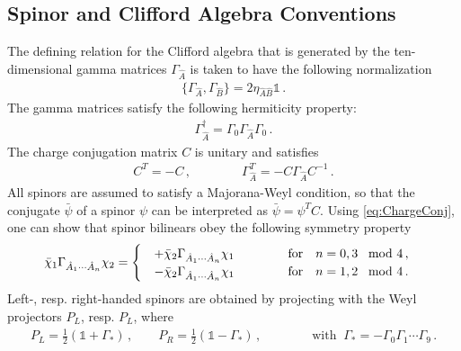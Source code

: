 \documentclass[a4paper,10pt,openany]{article}
\begin{document}
	
	\subsection{Spinor and Clifford Algebra Conventions} \label{ssec:fermconventions}
	
	The defining relation for the Clifford algebra that is generated by the ten-dimensional gamma matrices $\Gamma_{\hat{A}}$ is taken to have the following normalization
	\begin{align}
		\label{eq:Cliffalgdef}
		\{\Gamma_{\hat{A}}, \Gamma_{\hat{B}}\} = 2 \eta_{\hat{A}\hat{B}} \mathds{1} \,.
	\end{align}
	The gamma matrices satisfy the following hermiticity property:
	\begin{align}
		\label{eq:hermgammas}
		\Gamma_{\hat{A}}^\dag = \Gamma_0 \Gamma_{\hat{A}} \Gamma_0 \,.
	\end{align}
	The charge conjugation matrix $C$ is unitary and satisfies
	\begin{align}\label{eq:ChargeConj}
		C^T = -C\,,\qquad \qquad \Gamma_{\hat{A}}^T = - C\Gamma_{\hat A} C^{-1} \,.
	\end{align}
	All spinors are assumed to satisfy a Majorana-Weyl condition, so that the conjugate $\bar{\psi}$ of a spinor $\psi$ can be interpreted as $\bar{\psi} = \psi^T C$. Using \eqref{eq:ChargeConj}, one can show that spinor bilinears obey the following symmetry property
	\begin{align}\label{eq:flippingrulez}
		\bar\chi_1 \Gamma_{\hat A_1\cdots \hat A_n}\chi_2 =
		\begin{cases}
			\quad+\bar\chi_2 \Gamma_{\hat A_1\cdots \hat A_n} \chi_1 \hskip 1.5truecm \mathrm{for}\quad n=0,3\,\mod 4 \,, \\
			\quad-\bar\chi_2 \Gamma_{\hat A_1\cdots \hat A_n} \chi_1 \hskip 1.5truecm \mathrm{for}\quad n=1,2\,\mod 4\,.
		\end{cases}
	\end{align}
	Left-, resp. right-handed spinors are obtained by projecting with the Weyl projectors $P_L$, resp. $P_L$, where
	\begin{align}
		\label{eq:Weylproj}
		P_L = \frac12 \left(\mathds{1} + \Gamma_* \right) \,, \qquad  P_R = \frac12 \left(\mathds{1} - \Gamma_* \right) \,, \qquad \qquad \text{with }\ \Gamma_* = - \Gamma_0 \Gamma_1 \cdots \Gamma_9 \,.
	\end{align}
	
\end{document}
